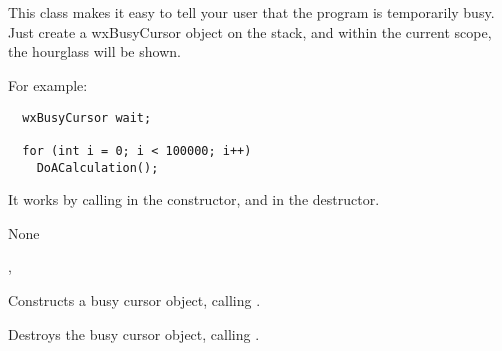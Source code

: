 \section{}\label{wxbusycursor}

This class makes it easy to tell your user that the program is temporarily busy.
Just create a wxBusyCursor object on the stack, and within the current scope,
the hourglass will be shown.

For example:

\begin{verbatim}
  wxBusyCursor wait;

  for (int i = 0; i < 100000; i++)
    DoACalculation();
\end{verbatim}

It works by calling  in the constructor,
and  in the destructor.


None


, 




Constructs a busy cursor object, calling .



Destroys the busy cursor object, calling .


